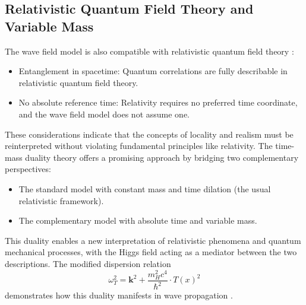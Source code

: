 \documentclass[12pt,a4paper]{article}
\begin{document}
	\subsection{Relativistic Quantum Field Theory and Variable Mass}
	The wave field model is also compatible with relativistic quantum field theory \cite{Weinberg1995}\relax:
	\begin{itemize}
		\item Entanglement in spacetime: Quantum correlations are fully describable in relativistic quantum field theory.
		\item No absolute reference time: Relativity requires no preferred time coordinate, and the wave field model does not assume one.
	\end{itemize}
	These considerations indicate that the concepts of locality and realism must be reinterpreted without violating fundamental principles like relativity. The time-mass duality theory offers a promising approach by bridging two complementary perspectives:
	\begin{itemize}
		\item The standard model with constant mass and time dilation (the usual relativistic framework).
		\item The complementary model with absolute time and variable mass.
	\end{itemize}
	This duality enables a new interpretation of relativistic phenomena and quantum mechanical processes, with the Higgs field acting as a mediator between the two descriptions. The modified dispersion relation
	\begin{equation}
		\omega_T^2 = \mathbf{k}^2 + \frac{m_H^2 c^4}{\hbar^2} \cdot T(x)^2
	\end{equation}
	demonstrates how this duality manifests in wave propagation \cite{Pascher2024}\relax.
	
\end{document}
